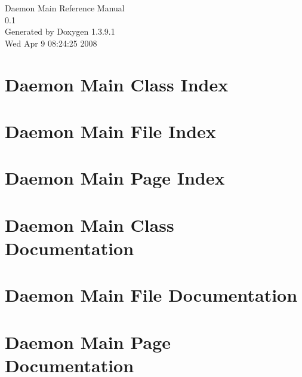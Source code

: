 \documentclass[a4paper]{book}
\begin{document}
\begin{titlepage}
\vspace*{7cm}
\begin{center}
{\Large Daemon Main Reference Manual\\[1ex]\large 0.1 }\\
\vspace*{1cm}
{\large Generated by Doxygen 1.3.9.1}\\
\vspace*{0.5cm}
{\small Wed Apr 9 08:24:25 2008}\\
\end{center}
\end{titlepage}
\clearemptydoublepage
{}
\tableofcontents
\clearemptydoublepage
{}
\chapter{Daemon Main Class Index}

\chapter{Daemon Main File Index}

\chapter{Daemon Main Page Index}

\chapter{Daemon Main Class Documentation}







\chapter{Daemon Main File Documentation}
























\chapter{Daemon Main Page Documentation}

\printindex
\end{document}
